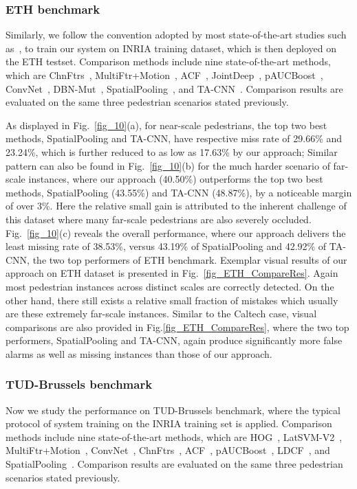 \documentclass[10pt,journal,compsoc,twoside]{IEEEtran}
\begin{document}
\subsubsection{ETH benchmark}
Similarly, we follow the convention adopted by most state-of-the-art studies such as~\cite{ZhaEtAl:eccv16,RedEtAl:cvpr16,CaiEtAl:eccv16,Gir:iccv15},
to train our system on INRIA training dataset, which is then deployed on the ETH testset.
%
Comparison methods include nine state-of-the-art methods, which are ChnFtrs~\cite{DolEtAl:bmvc09}, MultiFtr+Motion~\cite{WalEtAl:cvpr10}, ACF~\cite{DolEtAl:tpami14},
JointDeep~\cite{OuyWan:iccv13}, pAUCBoost~\cite{PaiSheHen:iccv13}, ConvNet~\cite{SerEtAl:cvpr13}, DBN-Mut~\cite{OuyZenWan:cvpr13}, SpatialPooling~\cite{PaiSheHen:eccv14},
and TA-CNN~\cite{TiaEtAl:cvpr15}.
%
Comparison results are evaluated on the same three pedestrian scenarios stated previously.

As displayed in Fig.~\ref{fig_10}(a), for near-scale pedestrians, the top two best methods, SpatialPooling and TA-CNN, have respective miss rate of 29.66\% and 23.24\%,
which is further reduced to as low as 17.63\% by our approach;
Similar pattern can also be found in Fig.~\ref{fig_10}(b) for the much harder scenario of far-scale instances,
where our approach (40.50\%) outperforms the top two best methods, SpatialPooling (43.55\%) and TA-CNN (48.87\%), by a noticeable margin of over 3\%.
Here the relative small gain is attributed to the inherent challenge of this dataset where many far-scale pedestrians are also severely occluded.
Fig.~\ref{fig_10}(c) reveals the overall performance,
where our approach delivers the least missing rate of 38.53\%, versus 43.19\% of SpatialPooling and 42.92\% of TA-CNN, the two top performers of ETH benchmark.
%
Exemplar visual results of our approach on ETH dataset is presented in Fig.~\ref{fig_ETH_CompareRes}.
Again most pedestrian instances across distinct scales are correctly detected.
On the other hand, there still exists a relative small fraction of mistakes which usually are these extremely far-scale instances.
Similar to the Caltech case, visual comparisons are also provided in Fig.\ref{fig_ETH_CompareRes},
where the two top performers, SpatialPooling and TA-CNN, again produce significantly more false alarms as well as missing instances than those of our approach.



\subsubsection{TUD-Brussels benchmark}
Now we study the performance on TUD-Brussels benchmark, where the typical protocol of system training on the INRIA training set is applied.
%
Comparison methods include nine state-of-the-art methods, which are HOG~\cite{DalTri:cvpr05}, LatSVM-V2~\cite{FelEtAl:tpami10}, MultiFtr+Motion~\cite{WalEtAl:cvpr10},
ConvNet~\cite{SerEtAl:cvpr13}, ChnFtrs~\cite{DolEtAl:bmvc09}, ACF~\cite{DolEtAl:tpami14}, pAUCBoost~\cite{PaiSheHen:iccv13}, LDCF~\cite{NamDolHan:nips14},
and SpatialPooling~\cite{PaiSheHen:eccv14}.
%
Comparison results are evaluated on the same three pedestrian scenarios stated previously.
\end{document}
